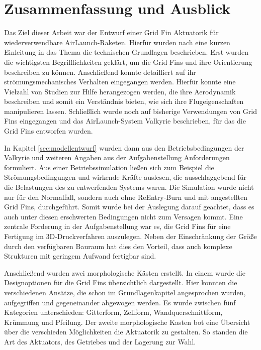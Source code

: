 \chapter{Zusammenfassung und Ausblick}
Das Ziel dieser Arbeit war der Entwurf einer Grid Fin Aktuatorik für wiederverwendbare AirLaunch-Raketen. Hierfür wurden nach eine kurzen Einleitung in das Thema die technischen Grundlagen beschrieben. Erst wurden die wichtigsten Begrifflichkeiten geklärt, um die Grid Fins und ihre Orientierung beschreiben zu können. Anschließend konnte detailliert auf ihr strömungsmechanisches Verhalten eingegangen werden. Hierfür konnte eine Vielzahl von Studien zur Hilfe herangezogen werden, die ihre Aerodynamik beschreiben und somit ein Verständnis bieten, wie sich ihre Flugeigenschaften manipulieren lassen. Schließlich wurde noch auf bisherige Verwendungen von Grid Fins eingegangen und das AirLaunch-System Valkyrie beschrieben, für das die Grid Fins entworfen wurden.

In Kapitel \ref{sec:modellentwurf} wurden dann aus den Betriebsbedingungen der Valkyrie und weiteren Angaben aus der Aufgabenstellung Anforderungen formuliert. Aus einer Betriebssimulation ließen sich zum Beispiel die Strömungsbedingungen und wirkende Kräfte auslesen, die ausschlaggebend für die Belastungen des zu entwerfenden Systems waren. Die Simulation wurde nicht nur für den Normalfall, sondern auch ohne ReEntry-Burn und mit angestellten Grid Fins, durchgeführt. Somit wurde bei der Auslegung darauf geachtet, dass es auch unter diesen erschwerten Bedingungen nicht zum Versagen kommt. Eine zentrale Forderung in der Aufgabenstellung war es, die Grid Fins für eine Fertigung im 3D-Druckverfahren auszulegen. Neben der Einschränkung der Größe durch den verfügbaren Bauraum hat dies den Vorteil, dass auch komplexe Strukturen mit geringem Aufwand fertigbar sind.

Anschließend wurden zwei morphologische Kästen erstellt. In einem wurde die Designoptionen für die Grid Fins übersichtlich dargestellt. Hier konnten die verschiedenen Ansätze, die schon im Grundlagenkapitel angesprochen wurden, aufgegriffen und gegeneinander abgewogen werden. Es wurde zwischen fünf Kategorien unterschieden: Gitterform, Zellform, Wandquerschnittform, Krümmung und Pfeilung. Der zweite morphologische Kasten bot eine Übersicht über die verschieden Möglichkeiten die Aktuatorik zu gestalten. So standen die Art des Aktuators, des Getriebes und der Lagerung zur Wahl.

